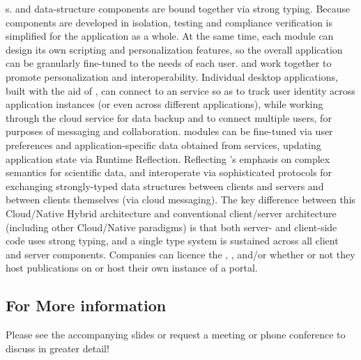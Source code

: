 \documentclass[10pt,letterpaper]{article}
\begin{document}
{\GUI}s.  {\lfGUI} and data-structure components are 
bound together via strong typing.  Because {\VersatileUX} 
components are developed in isolation, testing and 
compliance verification is simplified for the application 
as a whole.  At the same time, each {\VersatileUX} 
module can design its own scripting and personalization 
features, so the overall application can be 
granularly fine-tuned to the needs of each user.
\p{}
{\NDPCloud} and {\VersatileUX} work together to 
promote personalization and interoperability.  
Individual desktop applications, built 
with the aid of {\VersatileUX}, can connect to an 
{\NDPCloud} service so as to track user identity across 
application instances (or even across different applications), 
while working through the cloud service for data backup and 
to connect multiple users, for purposes of 
messaging and collaboration.  
{\VersatileUX} modules can be fine-tuned via 
user preferences and application-specific data obtained from 
{\NDPCloud} services, updating application state via 
Runtime Reflection.  Reflecting {\MOSAIC}'s 
emphasis on complex semantics for scientific data, 
{\NDPCloud} and {\VersatileUX} interoperate via 
sophisticated protocols for exchanging 
strongly-typed data structures between clients and 
servers and between clients themselves (via cloud messaging).  
The key difference between this Cloud/Native Hybrid 
architecture and conventional client/server architecture 
(including other Cloud/Native paradigms) is that 
both server- and client-side code uses 
strong typing, and a single type system is 
sustained across all client and server components.
\p{}
Companies can licence the {\MOSAIC} {\SDK}, {\VersatileUX}, and/or 
{\NDPCloud} whether or not they 
host publications on {\MOSAIC} or host their own instance 
of a {\MOSAIC} portal.

\subsection{For More information}
Please see the accompanying slides or request a meeting 
or phone conference to discuss {\MOSAIC} in greater detail!
\end{document}
